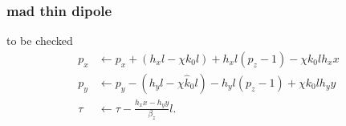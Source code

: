 \documentclass[english]{article}
\begin{document}
\subsubsection{mad thin dipole}

to be checked
\begin{align}
  p_x &\leftarrow p_x + (h_x l - \chi k_0 l)  + h_x l (p_z -1) - \chi k_0 l h_x x \\
  p_y &\leftarrow p_y - (h_y l - \chi \hat k_0 l) - h_y l (p_z-1) + \chi k_0 l h_y y\\
  \tau &\leftarrow \tau - \frac{h_xx - h_yy}{\beta_z}  l.
\end{align}


\end{document}
